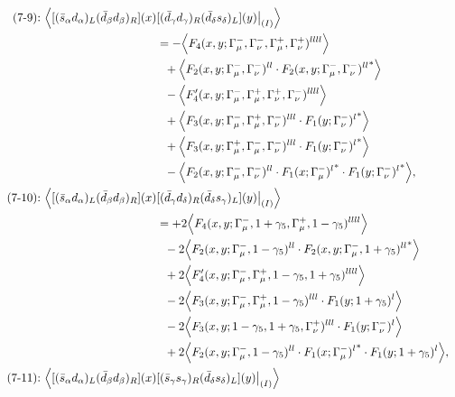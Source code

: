 \begin{align}
\\
\mbox{(7-9):}\ 
\Big\langle
[(\bar s_\alpha d_\alpha)_L(\bar d_\beta d_\beta)_R](x)&
[(\bar d_\gamma d_\gamma)_R(\bar d_\delta s_\delta)_L](y)\big|_{(I)}
\Big\rangle
\notag\\*
&=
 - \Big\langle F_4(x,y;\Gamma_\mu^-,\Gamma_\nu^-,\Gamma_\mu^+,\Gamma_\nu^+)^{llll}\Big\rangle
\notag\\*&\ \ 
 + \Big\langle F_2(x,y;\Gamma_\mu^-,\Gamma_\nu^-)^{ll} \cdot {F_2(x,y;\Gamma_\mu^-,\Gamma_\nu^-)^{ll}}^*\Big\rangle
\notag\\*&\ \ 
 - \Big\langle F_4'(x,y;\Gamma_\mu^-,\Gamma_\mu^+,\Gamma_\nu^+,\Gamma_\nu^-)^{llll}\Big\rangle
\notag\\*&\ \ 
 + \Big\langle F_3(x,y;\Gamma_\mu^-,\Gamma_\mu^+,\Gamma_\nu^-)^{lll} \cdot {F_1(y;\Gamma_\nu^-)^l}^*\Big\rangle
\notag\\*&\ \ 
 + \Big\langle F_3(x,y;\Gamma_\mu^+,\Gamma_\mu^-,\Gamma_\nu^-)^{lll} \cdot {F_1(y;\Gamma_\nu^-)^l}^*\Big\rangle
\notag\\*&\ \ 
 - \Big\langle F_2(x,y;\Gamma_\mu^-,\Gamma_\nu^-)^{ll} \cdot {F_1(x;\Gamma_\mu^-)^l}^* \cdot {F_1(y;\Gamma_\nu^-)^l}^*\Big\rangle,
\\
\mbox{(7-10):}\ 
\Big\langle
[(\bar s_\alpha d_\alpha)_L(\bar d_\beta d_\beta)_R](x)&
[(\bar d_\gamma d_\delta)_R(\bar d_\delta s_\gamma)_L](y)\big|_{(I)}
\Big\rangle
\notag\\*
&=
 + 2\Big\langle F_4(x,y;\Gamma_\mu^-,1+\gamma_5,\Gamma_\mu^+,1-\gamma_5)^{llll}\Big\rangle
\notag\\*&\ \ 
-2\Big\langle F_2(x,y;\Gamma_\mu^-,1-\gamma_5)^{ll} \cdot {F_2(x,y;\Gamma_\mu^-,1+\gamma_5)^{ll}}^*\Big\rangle
\notag\\*&\ \ 
 + 2\Big\langle F_4'(x,y;\Gamma_\mu^-,\Gamma_\mu^+,1-\gamma_5,1+\gamma_5)^{llll}\Big\rangle
\notag\\*&\ \ 
-2\Big\langle F_3(x,y;\Gamma_\mu^-,\Gamma_\mu^+,1-\gamma_5)^{lll} \cdot F_1(y;1+\gamma_5)^l\Big\rangle
\notag\\*&\ \ 
-2\Big\langle F_3(x,y;1-\gamma_5,1+\gamma_5,\Gamma_\nu^+)^{lll} \cdot F_1(y;\Gamma_\nu^-)^l\Big\rangle
\notag\\*&\ \ 
 + 2\Big\langle F_2(x,y;\Gamma_\mu^-,1-\gamma_5)^{ll} \cdot {F_1(x;\Gamma_\mu^-)^l}^* \cdot F_1(y;1+\gamma_5)^l\Big\rangle,
\\
\mbox{(7-11):}\ 
\Big\langle
[(\bar s_\alpha d_\alpha)_L(\bar d_\beta d_\beta)_R](x)&
[(\bar s_\gamma s_\gamma)_R(\bar d_\delta s_\delta)_L](y)\big|_{(I)}
\Big\rangle
\notag\\*

\end{align}
